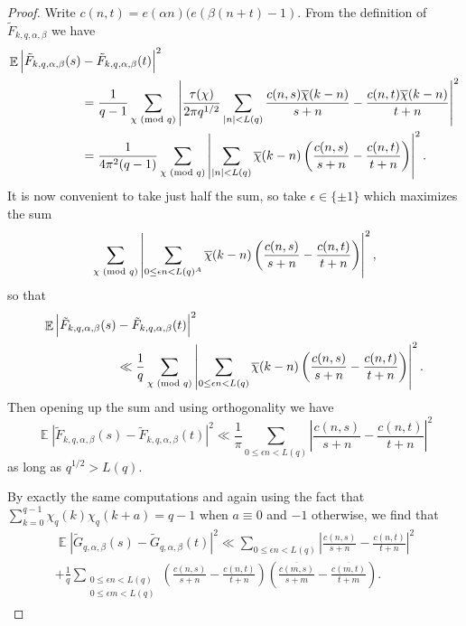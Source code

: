 \documentclass[12pt, a4paper]{amsart}
\theoremstyle{remark}
\newcommand{\abs}[1]{\left|#1\right|}
\renewcommand{\mod}[1]{{\ifmmode\text{\rm\ (mod~$#1$)}\else\discretionary{}{}{\hbox{ }}\rm(mod~$#1$)\fi}}
\newcommand{\chibar}{\overline \chi}
\DeclareMathOperator{\E}{\mathbb{E}}
\begin{document}
\begin{proof}
    Write $c(n, t) = e(\alpha n)(e(\beta(n + t) - 1)$.
    From the definition of $\tilde F_{k,q,\alpha,\beta}$ we have
\begin{align*}
    \E \Big|\tilde F_{k,q,\alpha,\beta}(s)& -  \tilde F_{k,q,\alpha,\beta}(t)\Big|^2 \\
   & = \frac{1}{q-1} \sum_{\chi \mod q} 
    \abs{
        \frac{\tau(\chi)}{2\pi q^{1/2}}
        \sum_{\abs{n} < L(q)}
    \frac{c(n,s)\chibar(k - n)}{s + n} - 
    \frac{c(n,t)\chibar(k - n)}{t + n}
    }^2 \\
   & = \frac{1}{4\pi^2(q-1)} \sum_{\chi \mod q}
    \abs{
        \sum_{\abs{n} < L(q)}
        \chibar(k - n)\left(
        \frac{c(n,s)}{s + n} - 
        \frac{c(n,t)}{t + n}
        \right)
    }^2.
\end{align*}
It is now convenient to take just half the sum, so take 
$\epsilon \in \{\pm 1\}$ which maximizes the sum
\[
\sum_{\chi \mod q}
    \abs{
        \sum_{0 \le \epsilon n < L(q)^A}
        \chibar(k -n)\left(
        \frac{c(n,s)}{s + n} - 
        \frac{c(n,t)}{t + n}
        \right)
    }^2,
\]
so that
\begin{align*}
    \E \Big|\tilde F_{k,q,\alpha,\beta}(s)& -  \tilde F_{k,q,\alpha,\beta}(t)\Big|^2 \\
   & \ll \frac{1}{q} \sum_{\chi \mod q}
    \abs{
        \sum_{0 \le \epsilon n < L(q)}
        \chibar(k - n)\left(
        \frac{c(n,s)}{s + n} - 
        \frac{c(n,t)}{t + n}
        \right)
    }^2.
\end{align*}
Then opening up the sum and using orthogonality we have
\[
    \E \abs{\tilde F_{k,q,\alpha,\beta}(s) - \tilde F_{k,q,\alpha,\beta}(t)}^2
    \ll \frac{1}{\pi}
        \sum_{0 \le \epsilon n < L(q)}
        \abs{
        \frac{c(n,s)}{s + n} - 
        \frac{c(n,t)}{t + n}
    }^2
\]
as long as $q^{1/2} > L(q)$.

By exactly the same computations and again using the fact that
$\sum_{k=0}^{q-1} \chi_q(k)\chi_q(k+a) = q-1$ when $a \equiv 0$
and $-1$ otherwise, we find that
\begin{multline*}
    \E \abs{\tilde G_{q,\alpha,\beta}(s) - \tilde G_{q,\alpha,\beta}(t)}^2
    \ll 
        \sum_{0 \le \epsilon n < L(q)}
        \abs{
        \frac{c(n,s)}{s + n} - 
        \frac{c(n,t)}{t + n}
    }^2 \\
    + \frac{1}{q} 
    \sum_{\substack{0 \le \epsilon n < L(q) \\ 0 \le \epsilon m < L(q)} }
    \left(\frac{c(n,s)}{s+n} - \frac{c(n,t)}{t + n}\right)
    \left(\frac{\overline{c(m,s)}}{s+m} - \frac{\overline{c(m,t)}}{t + m}\right).
\end{multline*}


\end{proof}
\end{document}
